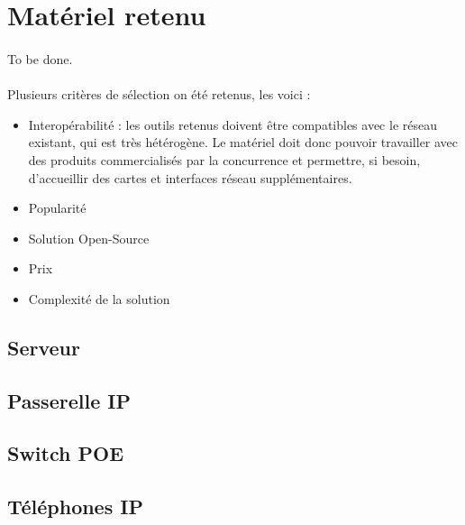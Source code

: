 \section{Matériel retenu}

\paragraph{} To be done.

\paragraph{} Plusieurs critères de sélection on été retenus, les voici :
\begin{itemize}
	\item Interopérabilité : les outils retenus doivent être compatibles avec le
	réseau existant, qui est très hétérogène. Le matériel doit donc pouvoir
	travailler avec des produits commercialisés par la concurrence et permettre,
	si besoin, d'accueillir des cartes et interfaces réseau supplémentaires.
	\item Popularité
	\item Solution Open-Source
	\item Prix
	\item Complexité de la solution
\end{itemize}

\subsection{Serveur}
\subsection{Passerelle IP}
\subsection{Switch POE}
\subsection{Téléphones IP}
